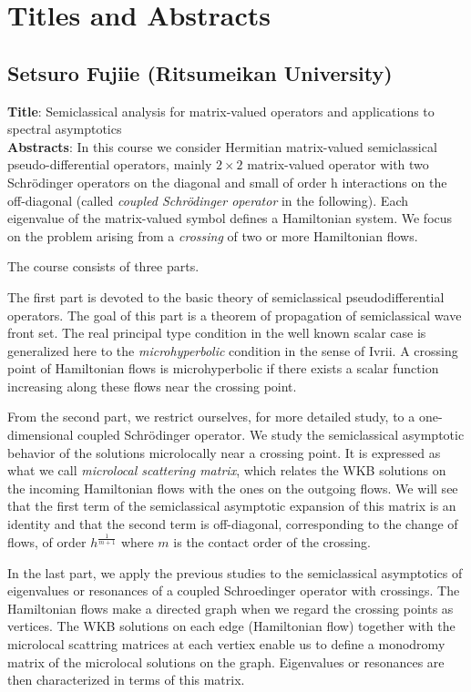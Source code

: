 \documentclass[a4paper,11pt]{article}
\numberwithin{equation}{section}
\begin{document}
\newpage

\section*{Titles and Abstracts}

\subsection*{\textbf{Setsuro Fujiie}  (Ritsumeikan University)}
\textbf{Title}: Semiclassical analysis for matrix-valued operators
and applications to spectral asymptotics\\
\textbf{Abstracts}: In this course we consider Hermitian matrix-valued semiclassical pseudo-differential operators, mainly $2\times 2$ matrix-valued operator with two Schr\"odinger operators on the diagonal and small of order h interactions on the off-diagonal (called {\it coupled Schr\"odinger operator} in the following). Each eigenvalue of the matrix-valued symbol defines a Hamiltonian system. We focus on the problem arising from a {\it crossing} of two or more Hamiltonian flows.

The course consists of three parts.

The first part is devoted to the basic theory of semiclassical
pseudodifferential operators. The goal of this part is a theorem of propagation of semiclassical wave front set. The real principal type condition in the well known scalar case is generalized here to the {\it microhyperbolic} condition in the sense of Ivrii.
A crossing point of Hamiltonian flows is microhyperbolic if there exists a scalar function increasing along these flows near the crossing point.

From the second part, we restrict ourselves, for more detailed study, 
to a one-dimensional coupled Schr\"odinger operator. We study the semiclassical asymptotic behavior of the solutions microlocally near a crossing point. It is expressed as what we call {\it microlocal scattering
matrix}, which relates the WKB solutions on the incoming Hamiltonian flows
with the ones on the outgoing flows. We will see that the first term of the semiclassical asymptotic expansion of this matrix is an identity and that the second term is off-diagonal, corresponding to the change of flows, of order $h^{\frac 1{m+1}}$ where $m$ is the contact order of the crossing.

In the last part, we apply the previous studies to the semiclassical
asymptotics of eigenvalues or resonances of a coupled Schroedinger operator with crossings. The Hamiltonian flows make a directed graph 
when we regard the crossing points as vertices. The WKB solutions on each edge (Hamiltonian flow) together with the microlocal scattring matrices at each vertiex enable us to define a monodromy matrix of the microlocal solutions on the graph.
Eigenvalues or resonances are then characterized in terms of this matrix.
\end{document}
